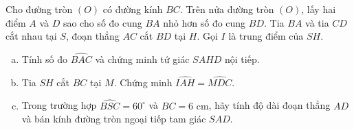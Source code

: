 \begin{bt}%
Cho đường tròn $(O)$ có đường kính $BC$. Trên nửa đường tròn $(O)$, lấy hai điểm $A$ và $D$ sao cho số đo cung $BA$ nhỏ hơn số đo cung $BD$. Tia $BA$ và tia $CD$ cắt nhau tại $S$, đoạn thẳng $AC$ cắt $BD$ tại $H$. Gọi $I$ là trung điểm của $SH$.
\begin{enumerate}[a)]
	\item Tính số đo $\widehat{BAC}$ và chứng minh tứ giác $SAHD$ nội tiếp.
	\item Tia $SH$ cắt $BC$ tại $M$. Chứng minh $\widehat{IAH} = \widehat{MDC}$.
	\item Trong trường hợp $\widehat{BSC} = 60^\circ$ và $BC = 6\text{ cm}$, hãy tính độ dài đoạn thẳng $AD$ và bán kính đường tròn ngoại tiếp tam giác $SAD$.
\end{enumerate}
\end{bt}
